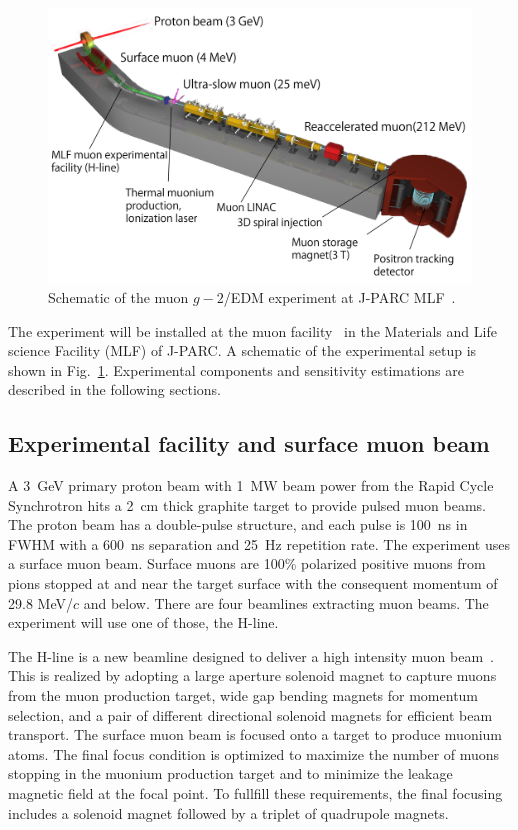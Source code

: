 \begin{figure}[t]
  \begin{center}
      \includegraphics[width=15cm,bb=0 0 1440 936]{Fig/g-2edm_overview_en.pdf}
  \end{center}
  \caption{Schematic of the muon $g-2$/EDM experiment at J-PARC MLF~\cite{TDRsummarypaper}. }
  \label{fig:setup}
\end{figure}

The experiment will be installed at the muon facility~\cite{Higemoto:2017} in
the Materials and Life science Facility (MLF) of J-PARC.
A schematic of the experimental setup is shown in Fig.~\ref{fig:setup}. 
Experimental components and sensitivity estimations are described in the following sections.

\subsection{Experimental facility and surface muon beam}
A 3~GeV primary proton beam with 1~MW beam power from the Rapid Cycle Synchrotron hits 
a 2~cm thick graphite target to provide pulsed muon beams.
The proton beam has a double-pulse structure, and each pulse is 100~ns in FWHM 
with a 600~ns separation and 25~Hz repetition rate.
The experiment uses a surface muon beam.
Surface muons are 100\% polarized positive muons from pions 
stopped at and near the target surface with the consequent momentum of 29.8 MeV/$c$ and below.
There are four beamlines extracting muon beams.
The experiment will use one of those, the H-line.

The H-line is a new beamline designed 
to deliver a high intensity muon beam~\cite{Kawamura:2014hja}.
This is realized by 
adopting a large aperture solenoid magnet to capture muons from the muon production target,
wide gap bending magnets for momentum selection,
and a pair of different directional solenoid magnets for efficient beam transport.
The surface muon beam is focused onto a target to produce muonium atoms.
The final focus condition is optimized to maximize the number of muons stopping in the muonium production 
target and to minimize the leakage magnetic field at the focal point. To fullfill these 
requirements, 
the final focusing includes a solenoid magnet
followed by a triplet of quadrupole magnets.

